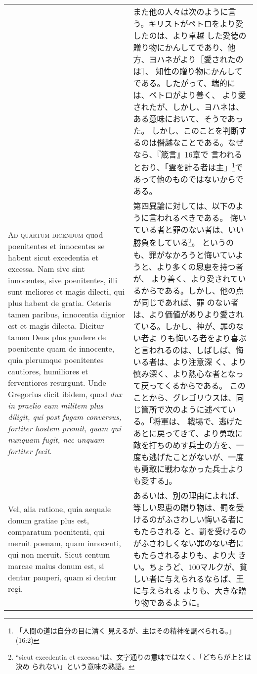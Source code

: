 \documentclass[10pt]{jsarticle} %
\begin{document}
\begin{longtable}{p{21em}p{21em}}
&

また他の人々は次のように言う。キリストがペトロをより愛したのは、より卓越
 した愛徳の贈り物にかんしてであり、他方、ヨハネがより［愛されたのは］、
 知性の贈り物にかんしてである。したがって、端的には、ペトロがより善く、
 より愛されたが、しかし、ヨハネは、ある意味において、そうであった。
しかし、このことを判断するのは僭越なことである。なぜなら、『箴言』16章で
 言われるとおり、「霊を計る者は主」\footnote{「人間の道は自分の目に清く
 見えるが、主はその精神を調べられる。」(16:2)}であって他のものではないからである。


\\


{\scshape Ad quartum dicendum} quod poenitentes et innocentes se habent
 sicut excedentia et excessa. Nam sive sint innocentes, sive
 poenitentes, illi sunt meliores et magis dilecti, qui plus habent de
 gratia. Ceteris tamen paribus, innocentia dignior est et magis
 dilecta. Dicitur tamen Deus plus gaudere de poenitente quam de
 innocente, quia plerumque poenitentes cautiores, humiliores et
 ferventiores resurgunt. Unde Gregorius dicit ibidem, quod {\itshape dux in
 praelio eum militem plus diligit, qui post fugam conversus, fortiter
 hostem premit, quam qui nunquam fugit, nec unquam fortiter fecit}. 

&

第四異論に対しては、以下のように言われるべきである。
 悔いている者と罪のない者は、いい勝負をしている\footnote{ ``sicut
 excedentia et excessa''は、文字通りの意味ではなく、「どちらが上とは決め
 られない」という意味の熟語。}。
 というのも、罪がなかろうと悔いていようと、より多くの恩恵を持つ者が、
 より善く、より愛されているからである。しかし、他の点が同じであれば、罪
 のない者は、より価値がありより愛されている。しかし、神が、罪のない者よ
 りも悔いる者をより喜ぶと言われるのは、しばしば、悔いる者は、より注意深
 く、より慎み深く、より熱心な者となって戻ってくるからである。
このことから、グレゴリウスは、同じ箇所で次のように述べている。「将軍は、
 戦場で、逃げたあとに戻ってきて、より勇敢に敵を打ちのめす兵士の方を、一
 度も逃げたことがないが、一度も勇敢に戦わなかった兵士よりも愛する」。


\\

Vel,
 alia ratione, quia aequale donum gratiae plus est, comparatum
 poenitenti, qui meruit poenam, quam innocenti, qui non meruit. Sicut
 centum marcae maius donum est, si dentur pauperi, quam si dentur regi.


&

あるいは、別の理由によれば、等しい恩恵の贈り物は、罰を受けるのがふさわしい悔いる者にもたらされる
 と、罰を受けるのがふさわしくない罪のない者にもたらされるよりも、より大
 きい。ちょうど、100マルクが、貧しい者に与えられるならば、王に与えられる
 よりも、大きな贈り物であるように。




\end{longtable}
\end{document}
